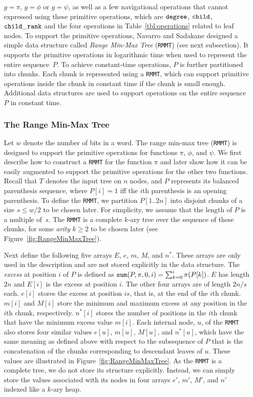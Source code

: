 $g = \pi$, $g = \phi$ or $g = \psi$, as well as a few navigational operations
that cannot expressed using these primitive operations, which are $\mathtt{degree}$,
$\mathtt{child}$, $\mathtt{child\_rank}$ and the four operations in Table~\ref{tbl:operations}
related to leaf nodes.
To support the primitive operations, Navarro and Sadakane designed a simple data
structure called \emph{Range Min-Max Tree} ({\tt RMMT}) (see next subsection).
It supports the primitive operations in logarithmic time when used to represent
the entire sequence~$P$.
To achieve constant-time operations, $P$ is further partitioned into chunks.
Each chunk is represented using a {\tt RMMT}, which can support primitive
operations inside the chunk in constant time if the chunk is small enough.
Additional data structures are used to support operations on the entire sequence
$P$ in constant time.

\subsubsection{The Range Min-Max Tree}

Let $w$ denote the number of bits in a word.
The range min-max tree ({\tt RMMT}) is designed to support the primitive
operations for functions $\pi$, $\phi$, and $\psi$.
We first describe how to construct a {\tt RMMT} for the function $\pi$ and
later show how it can be easily augmented to support the primitive operations
for the other two functions.
Recall that $T$ denotes the input tree on $n$ nodes, and $P$ represents its
balanced parenthesis sequence, where $P[i] = 1$ iff the $i$th
parenthesis is an opening parenthesis.
To define the {\tt RMMT}, we partition $P[1..2n]$ into disjoint chunks of
a size $s \le w/2$ to be chosen later.
For simplicity, we assume that the length of $P$ is a multiple of~$s$.
The {\tt RMMT} is a complete $k$-ary tree over the sequence of these chunks,
for some \emph{arity} $k \ge 2$ to be chosen later (see
Figure~\ref{fig:RangeMinMaxTree}).

Next define the following five arrays $E$, $e$, $m$, $M$, and $n^*$.
These arrays are only used in the description and are not stored explicitly
in the data structure.
The {\em excess} at position $i$ of $P$ is defined as $\mathtt{sum}(P,\pi,0,i) =
\sum_{k=0}^{i} \pi(P[k])$.
$E$ has length $2n$ and $E[i]$ is the excess at position $i$.
The other four arrays are of length $2n/s$ each.
$e[i]$ stores the excess at position $is$, that is, at the end of the $i$th
chunk.
$m[i]$ and $M[i]$ store the minimum and maximum excess at any position in the
$i$th chunk, respectively.
$n^*[i]$ stores the number of positions in the $i$th chunk that have the
minimum excess value $m[i]$.
Each internal node, $u$, of the {\tt RMMT} also stores four similar values
$e[u]$, $m[u]$, $M[u]$, and $n^*[u]$, which have the same meaning as defined
above with respect to the subsequence of $P$ that is the concatenation of the
chunks corresponding to descendant leaves of $u$.
These values are illustrated in Figure~\ref{fig:RangeMinMaxTree}.
As the {\tt RMMT} is a complete tree, we do not store its structure explicitly.
Instead, we can simply store the values associated with its nodes in four arrays
$e'$, $m'$, $M'$, and $n'$ indexed like a $k$-ary heap.

